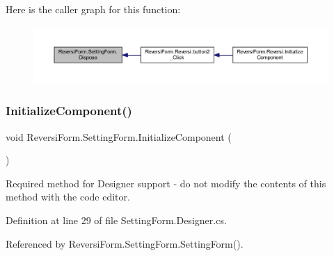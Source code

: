 Here is the caller graph for this function\+:\nopagebreak
\begin{figure}[H]
\begin{center}
\leavevmode
\includegraphics[width=350pt]{class_reversi_form_1_1_setting_form_ab4be09946d93ed193820f8d7acfc2cb5_icgraph}
\end{center}
\end{figure}
\mbox{\label{class_reversi_form_1_1_setting_form_a9b663029f37a28044ff2300fc66dc859}} 
\subsubsection{\texorpdfstring{Initialize\+Component()}{InitializeComponent()}}
{\footnotesize\ttfamily void Reversi\+Form.\+Setting\+Form.\+Initialize\+Component (\begin{DoxyParamCaption}{ }\end{DoxyParamCaption})\hspace{0.3cm}{\ttfamily [private]}}



Required method for Designer support -\/ do not modify the contents of this method with the code editor. 



Definition at line 29 of file Setting\+Form.\+Designer.\+cs.



Referenced by Reversi\+Form.\+Setting\+Form.\+Setting\+Form().

